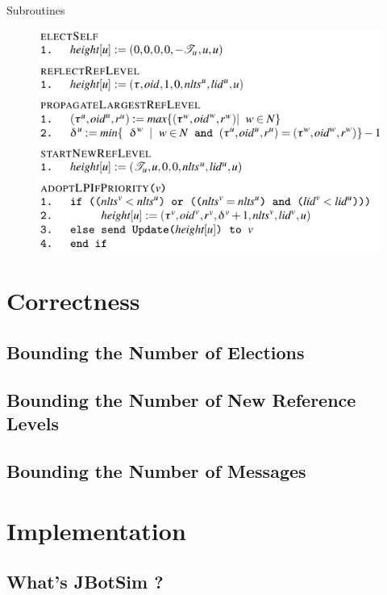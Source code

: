 \documentclass{beamer}
\begin{document}
\begin{frame}{Subroutines}
\begin{figure}[h]
	\centering
	\includegraphics[width=0.8\linewidth]{subroutines.png}
	\label{fig:figure1}
\end{figure}
\end{frame}


\section{Correctness}

\subsection{Bounding the Number of Elections}

\subsection{Bounding the Number of New Reference Levels}

\subsection{Bounding the Number of Messages}

\section{Implementation}
\subsection{What's JBotSim ?}
\end{document}
